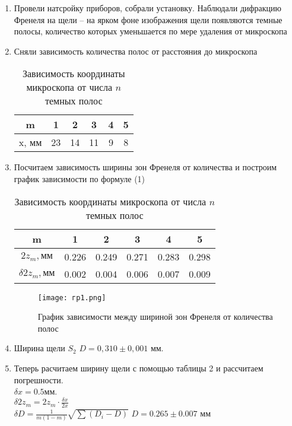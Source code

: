\documentclass[a4paper]{article}
\begin{document}
\begin{enumerate}
	\item Провели натсройку приборов, собрали установку. Наблюдали дифракцию Френеля
	на щели – на ярком фоне изображения щели появляются темные полосы, количество
	которых уменьшается по мере удаления от микроскопа
	\item Сняли зависимость количества полос от расстояния до микроскопа
	
	\begin{table}[h!]
		\caption{Зависимость координаты микроскопа от числа $ n $ темных полос}
		\begin{center}
			\begin{tabular}{|c|c|c|c|c|c|}
				\hline
				m & 1 & 2 & 3 & 4 & 5 \\
				\hline
				x, мм & 23 & 14 & 11 & 9 & 8 \\
				\hline
			\end{tabular}
		\end{center}
		\label{}
		\end{table}

	\item Посчитаем зависимость ширины зон Френеля от количества и построим график зависимости по формуле (1)

	\begin{table}[h!]
		\caption{Зависимость координаты микроскопа от числа $ n $ темных полос}
		\begin{center}
			\begin{tabular}{|c|c|c|c|c|c|}
				\hline
				m & 1 & 2 & 3 & 4 & 5 \\
				\hline
				$2z_m, мм$ & 0.226 & 0.249 & 0.271 & 0.283 & 0.298 \\
				\hline
				$\delta 2z_m, мм$ & 0.002 & 0.004 & 0.006 &0.007 & 0.009 \\
				\hline
			\end{tabular}
		\end{center}
		\label{}
		\end{table}
	
		\begin{figure}[H]
			\begin{center}
			\label{graf_a}
			\texttt{[image: гр1.png]}
			\caption{График зависимости между шириной зон Френеля от количества полос}
			\end{center}
		\end{figure}

	\item Ширина щели $S_2 $ $ D = 0,310 \pm 0, 001$ мм.
	\item Теперь расчитаем ширину щели с помощью таблицы 2 и рассчитаем погрешности. \\
	$\delta x = 0.5 мм$. \\
	$\delta2z_m = 2z_m \cdot\frac{\delta x}{2x}$ \\
	$\delta D = \frac{1}{m(1 - m)}\sqrt{\sum(D_i - D)}$  $D = 0.265 \pm 0.007$ мм


\end{enumerate}
\end{document}
